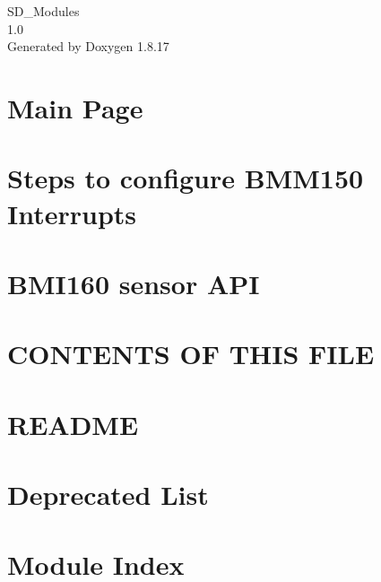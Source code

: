 \let\mypdfximage\pdfximage\def\pdfximage{\immediate\mypdfximage}\documentclass[twoside]{book}
\newcommand{\+}{\discretionary{\mbox{\scriptsize$\hookleftarrow$}}{}{}}
\newcommand{\clearemptydoublepage}{%
  \newpage{\pagestyle{empty}\cleardoublepage}%
}
\begin{document}
\hypersetup{pageanchor=false,
             bookmarksnumbered=true,
             pdfencoding=unicode
            }
\begin{titlepage}
\vspace*{7cm}
\begin{center}%
{\Large S\+D\+\_\+\+Modules \\[1ex]\large 1.\+0 }\\
\vspace*{1cm}
{\large Generated by Doxygen 1.8.17}\\
\end{center}
\end{titlepage}
\clearemptydoublepage
{}
\tableofcontents
\clearemptydoublepage
{}
\hypersetup{pageanchor=true}

\chapter{Main Page}
\label{index}\hypertarget{index}{}
\chapter{Steps to configure B\+M\+M150 Interrupts}
\label{md_bmx160__interrupt_settings}

\chapter{B\+M\+I160 sensor A\+PI}
\label{md_bmx160__r_e_a_d_m_e}

\chapter{C\+O\+N\+T\+E\+N\+TS OF T\+H\+IS F\+I\+LE}
\label{md_bno055__r_e_a_d_m_e}

\chapter{R\+E\+A\+D\+ME}
\label{md__r_e_a_d_m_e}

\chapter{Deprecated List}
\label{deprecated}

\chapter{Module Index}

\end{document}
